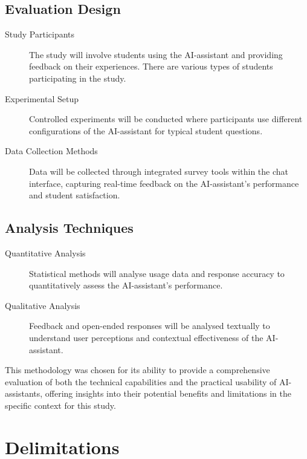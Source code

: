 \subsection{Evaluation Design}
\begin{description}
	\item[Study Participants] The study will involve students using the AI-assistant and providing feedback on their experiences. There are various types of students participating in the study.
	\item[Experimental Setup] Controlled experiments will be conducted where participants use different configurations of the AI-assistant for typical student questions.
	\item[Data Collection Methods] Data will be collected through integrated survey tools within the chat interface, capturing real-time feedback on the AI-assistant’s performance and student satisfaction.
\end{description}

\subsection{Analysis Techniques}
\begin{description}
	\item[Quantitative Analysis] Statistical methods will analyse usage data and response accuracy to quantitatively assess the AI-assistant's performance.
	\item[Qualitative Analysis] Feedback and open-ended responses will be analysed textually to understand user perceptions and contextual effectiveness of the AI-assistant.
\end{description}

This methodology was chosen for its ability to provide a comprehensive evaluation of both the technical capabilities and the practical usability of AI-assistants, offering insights into their potential benefits and limitations in the specific context for this study.


\section{Delimitations}
\label{sec:delimitations}


